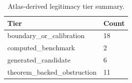 \begin{table}[h]
\centering
\caption{Atlas-derived legitimacy tier summary.}
\label{tab:legitimacy-tier-summary}
\footnotesize
\renewcommand{\arraystretch}{1.18}
\begin{tabular}{|p{}|p{}|}
\hline
Tier & Count \\
\hline
boundary\_\allowbreak{}or\_\allowbreak{}calibration & 18 \\
computed\_\allowbreak{}benchmark & 2 \\
generated\_\allowbreak{}candidate & 6 \\
theorem\_\allowbreak{}backed\_\allowbreak{}obstruction & 11 \\
\hline
\end{tabular}
\end{table}

